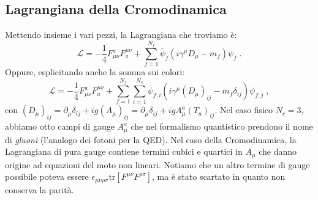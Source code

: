 \documentclass[12pt,a4paper]{article}
\theoremstyle{definition}
\newcommand{\lag}{\mathcal{L}}
\newcommand{\tr}{\mathrm{tr}}
\numberwithin{equation}{section}
\begin{document}
\subsection{Lagrangiana della Cromodinamica}
Mettendo insieme i vari pezzi, la Lagrangiana che troviamo è:
\begin{equation}
\boxed{
\lag=-\frac{1}{4}F_{\mu\nu}^aF^{\mu\nu}_a+\sum_{f=1}^{N_f}\overline{\psi}_f(i\gamma^{\mu}D_{\mu}-m_f)\psi_f
}\;.
\end{equation}
Oppure, esplicitando anche la somma sui colori:
\begin{equation}
\boxed{
\lag=-\frac{1}{4}F_{\mu\nu}^aF^{\mu\nu}_a+\sum_{f=1}^{N_f}\sum_{i=1}^{N_c}\overline{\psi}_{f,i}(i\gamma^{\mu}(D_{\mu})_{ij}-m_f\delta_{ij})\psi_{f,j}
}\;,
\end{equation}
con $(D_{\mu})_{ij}=\partial_{\mu}\delta_{ij}+ig(A_{\mu})_{ij}=\partial_{\mu}\delta_{ij}+igA_{\mu}^a(T_a)_{ij}$. Nel caso fisico $N_c=3$, abbiamo otto campi di gauge $A_{\mu}^a$ che nel formalismo quantistico prendono il nome di \emph{gluoni} (l'analogo dei fotoni per la QED). Nel caso della Cromodinamica, la Lagrangiana di pura gauge contiene termini cubici e quartici in $A_{\mu}$ che danno origine ad equazioni del moto non lineari. Notiamo che un altro termine di gauge possibile poteva essere $\epsilon_{\mu\nu\rho\sigma}\tr[F^{\mu\nu}F^{\rho\sigma}]$, ma è stato scartato in quanto non conserva la parità. \\
\end{document}

